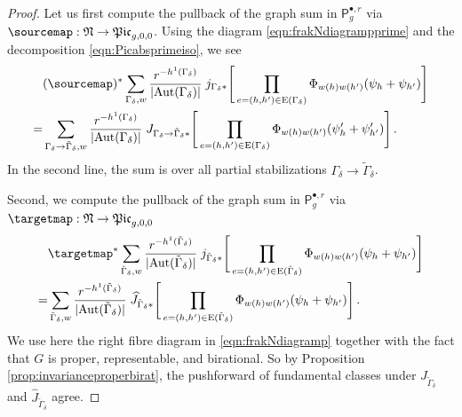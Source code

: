 \documentclass[a4paper,12pt]{article} %
\def\P{\mathsf{P}}
\def\Aut{{\rm Aut}}
\def\E{\mathrm{E}}
\theoremstyle{definition}
\theoremstyle{plain}%
\newcommand{\Picabs}{\mathfrak{Pic}}
\begin{document}
\begin{proof}
Let us first compute the pullback of the graph sum in $\P_g^{\bullet,r}$ via $\sourcemap : \frak N \to \Picabs_{g,0,0}$. Using the diagram \eqref{eqn:frakNdiagrampprime} and the decomposition \eqref{eqn:Picabsprimeiso}, we see
\begin{align} 
&(\sourcemap)^* \sum_{\Gamma_\delta, w}
\frac{r^{-h^1( \Gamma_\delta)}}{|\Aut(\Gamma_\delta)| }
\;
j_{\Gamma_\delta*}\Bigg[
\prod_{e=(h,h')\in \E(\Gamma_\delta)}
\Phi_{w(h)w(h')}(\psi_h + \psi_{h'}) \Bigg] \nonumber\\
=&\sum_{\Gamma_\delta \to \tilde \Gamma_\delta, w} \label{eqn:pprimepullb}
\frac{r^{-h^1( \Gamma_\delta)}}{|\Aut(\Gamma_\delta)| }
\;
J_{\Gamma_\delta \to \tilde \Gamma_\delta*}\Bigg[
\prod_{e=(h,h')\in \E(\Gamma_\delta)}
\Phi_{w(h)w(h')}(\psi'_h + \psi'_{h'}) \Bigg]\, .
\end{align}
In the second line, the sum is over all partial stabilizations $\Gamma_\delta \to \tilde \Gamma_\delta$.

Second, we compute the pullback of the graph sum in $\P_g^{\bullet,r}$ via $\targetmap : \frak N \to \Picabs_{g,0,0}$
\begin{align} 
&\targetmap^* \sum_{\tilde \Gamma_\delta, w}
\frac{r^{-h^1(\tilde  \Gamma_\delta)}}{|\Aut(\tilde \Gamma_\delta)| }
\;
j_{\tilde \Gamma_\delta*}\Bigg[
\prod_{e=(h,h')\in \E(\tilde \Gamma_\delta)}
\Phi_{w(h)w(h')}(\psi_h + \psi_{h'}) \Bigg]\nonumber \\
=&\sum_{\tilde \Gamma_\delta, w}\label{eqn:ppullb}
\frac{r^{-h^1(\tilde \Gamma_\delta)}}{|\Aut(\tilde \Gamma_\delta)| }
\;
\widehat J_{\tilde \Gamma_\delta*}\Bigg[
\prod_{e=(h,h')\in \E(\tilde \Gamma_\delta)}
\Phi_{w(h)w(h')}(\psi_h + \psi_{h'}) \Bigg]\, .
\end{align}
We use here the right fibre diagram in \eqref{eqn:frakNdiagramp} together with the fact that $G$ is proper, representable, and birational.  So by Proposition \ref{prop:invarianceproperbirat},
the pushforward of fundamental classes under $J_{\tilde \Gamma_\delta}$ and $\widehat J_{\tilde \Gamma_\delta}$ agree.


\end{proof}
\end{document}
